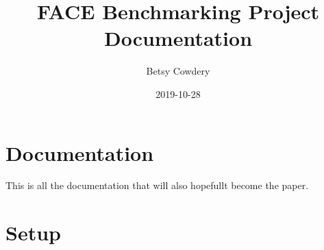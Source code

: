 \documentclass[]{book}
\title{FACE Benchmarking Project Documentation}
\author{Betsy Cowdery}
\date{2019-10-28}
\begin{document}
\maketitle

{
\setcounter{tocdepth}{1}
\tableofcontents
}
\hypertarget{documentation}{%
\chapter{Documentation}\label{documentation}}

This is all the documentation that will also hopefullt become the paper.

\hypertarget{setup}{%
\chapter*{Setup}\label{setup}}
\end{document}
